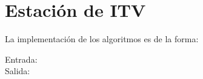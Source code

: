 \section{Estación de ITV}


La implementación de los algoritmos es de la forma:
\begin{description}
 \item[Entrada:] %
 \item[Salida:] %
\end{description}



